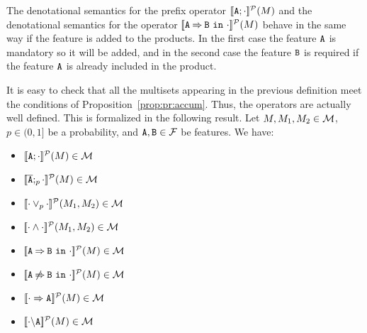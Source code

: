 The denotational semantics for the prefix operator
$[\![\mathtt{A};\cdot]\!]^{\cal P}(M)$
and the denotational semantics for the operator
$[\![\mathtt{A}\mathbin{\Rightarrow}\mathtt{B}\ \mathtt{in}\ \cdot]\!]^{\cal P}(M)$
behave in the same way if the feature is added
to the products. In the first case the feature $\mathtt{A}$ is mandatory
so it will be added, and in the second case the feature $\mathtt{B}$ is required
if the feature $\mathtt{A}$ is already included in the product.

It is easy to check that all the multisets appearing in the previous
definition meet the conditions of Proposition~\ref{prop:pr:accum}. Thus,
the operators are actually well defined. This is formalized in the
following result.
\bprop\label{prp:domain:prob}
  Let  $M,M_{1}, M_{2}\in{\cal M}$,
  $p\in(0,1]$ be a probability, and
  $\mathtt{A},\mathtt{B}\in{\cal F}$ be features. We have:
\begin{multicols}{2}
        \begin{itemize}
                \item $[\![\mathtt{A};\cdot]\!]^{\cal P}(M)\in{\cal M}$
                \item $[\![\overline{\mathtt{A}};_{p}\cdot]\!]^{\cal P}(M)\in{\cal M}$
                \item $[\![\cdot\mathbin{\lor}_{p}\cdot]\!]^{\cal P}(M_{1},M_{2})\in{\cal M}$
                \item $[\![\cdot\mathbin{\wedge}\cdot]\!]^{\cal P}(M_{1},M_{2})\in{\cal M}$
                \item $[\![\mathtt{A}\mathbin{\Rightarrow}\mathtt{B}\ \mathtt{in}\ \cdot]\!]^{\cal P}(M)\in{\cal M}$
                \item $[\![\mathtt{A}\mathbin{\not\Rightarrow}\mathtt{B}\ \mathtt{in}\ \cdot]\!]^{\cal P}(M)\in{\cal M}$
                \item $[\![\cdot\Rightarrow\mathtt{A}]\!]^{\cal P}(M)\in{\cal M}$
                \item $[\![\cdot\backslash\mathtt{A}]\!]^{\cal P}(M)\in{\cal M}$
        \end{itemize}
\end{multicols}
\eprop





